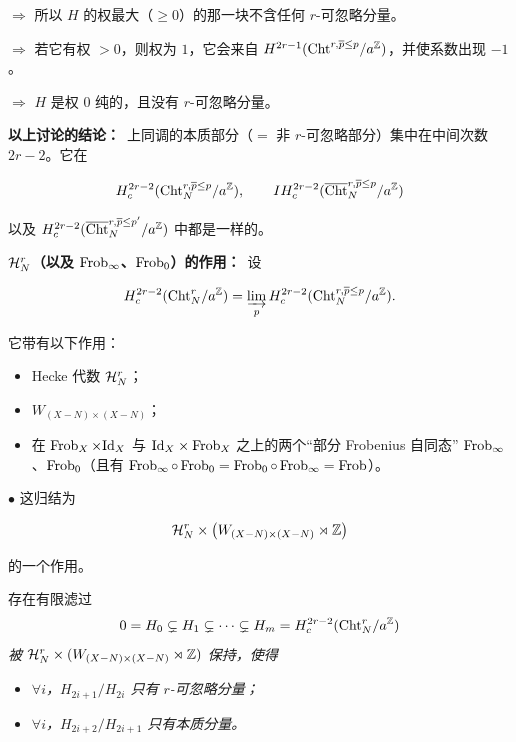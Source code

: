 $\Rightarrow$ 所以 $H$ 的权最大（$\geq 0$）的那一块不含任何 $r$-可忽略分量。


$\Rightarrow$ 若它有权 $> 0$，则权为 $1$，它会来自 $H^{2r-1}(\mathrm{Cht}^{r,\overline{p}\le p}/a^{\mathbb{Z}})$，并使系数出现 $-1$。

$\Rightarrow$ $H$ 是权 $0$ 纯的，且没有 $r$-可忽略分量。

\par\medskip
\noindent\textbf{以上讨论的结论：}\ 上同调的本质部分（$=$ 非 $r$-可忽略部分）集中在中间次数 $2r - 2$。它在

\[ H^{2r-2}_c(\mathrm{Cht}^{r,\overline{p}\le p}_N/a^{\mathbb{Z}}), \qquad IH^{2r-2}_c(\overline{\mathrm{Cht}}^{r,\overline{p}\le p}_N/a^{\mathbb{Z}}) \]

以及 $H^{2r-2}_c(\overline{\mathrm{Cht}}^{r,\overline{p}\le p'}_N/a^{\mathbb{Z}})$ 中都是一样的。

\par\medskip
\noindent\textbf{$\mathcal{H}^r_N$（以及 $\operatorname{Frob}_\infty$、$\operatorname{Frob}_0$）的作用：}\ 设

\[ H^{2r-2}_c(\mathrm{Cht}^r_N/a^{\mathbb{Z}}) = \varinjlim_{p} H^{2r-2}_c(\mathrm{Cht}^{r,\overline{p}\le p}_N/a^{\mathbb{Z}}). \]

它带有以下作用：

\begin{itemize}
\item Hecke 代数 $\mathcal{H}^r_N$；
\item $W_{(X-N)\times(X-N)}$；
\item 在 $\operatorname{Frob}_X \times \mathrm{Id}_X$ 与 $\mathrm{Id}_X \times \operatorname{Frob}_X$ 之上的两个“部分 Frobenius 自同态” $\operatorname{Frob}_\infty$、$\operatorname{Frob}_0$（且有 $\operatorname{Frob}_\infty \circ \operatorname{Frob}_0 = \operatorname{Frob}_0 \circ \operatorname{Frob}_\infty = \operatorname{Frob}$）。
\end{itemize}

\noindent$\bullet$ 这归结为

\[ \mathcal{H}^r_N \times \big(W_{(X-N)\times(X-N)} \rtimes \mathbb{Z}\big) \]

的一个作用。

\begin{lemma*}
存在有限滤过
\[ 0 = H_0 \subsetneq H_1 \subsetneq \cdots \subsetneq H_m = H^{2r-2}_c(\mathrm{Cht}^r_N/a^{\mathbb{Z}}) \]
\emph{被 $\mathcal{H}^r_N \times (W_{(X-N)\times(X-N)} \rtimes \mathbb{Z})$ 保持，使得}
\begin{itemize}
\item \emph{$\forall i$，$H_{2i+1}/H_{2i}$ 只有 $r$-可忽略分量；}
\item \emph{$\forall i$，$H_{2i+2}/H_{2i+1}$ 只有本质分量。}
\end{itemize}
\end{lemma*}

